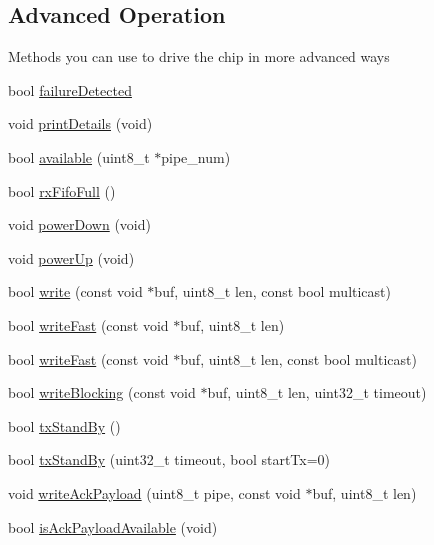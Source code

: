 \subsection*{Advanced Operation}
\label{_amgrpaf32cf1216e734b82e2b52429dae0bf6}%
 Methods you can use to drive the chip in more advanced ways \begin{DoxyCompactItemize}
\item 
bool \hyperlink{classNRF24L01_a749f38c45c00905b3d8e8c180626bff6}{failure\+Detected}
\item 
void \hyperlink{classNRF24L01_ae5c878a568b54ba045a99b9de377b13b}{print\+Details} (void)
\item 
bool \hyperlink{classNRF24L01_a6bfbb693418e2d60556637b6a3599d05}{available} (uint8\+\_\+t $\ast$pipe\+\_\+num)
\item 
bool \hyperlink{classNRF24L01_aebd4d389685333013b4bd12662c0b411}{rx\+Fifo\+Full} ()
\item 
void \hyperlink{classNRF24L01_abaf0ed9cb5b24890631d7b8bc0e3cd82}{power\+Down} (void)
\item 
void \hyperlink{classNRF24L01_a8e184a0a6ca30fbae69c1331a567deda}{power\+Up} (void)
\item 
bool \hyperlink{classNRF24L01_af59b3fd7aece1ae295a2e634a57d2b02}{write} (const void $\ast$buf, uint8\+\_\+t len, const bool multicast)
\item 
bool \hyperlink{classNRF24L01_a693f48de67c8b11ed5860dc481fcfc99}{write\+Fast} (const void $\ast$buf, uint8\+\_\+t len)
\item 
bool \hyperlink{classNRF24L01_a094a978ed0c7da890c90351bd945fabe}{write\+Fast} (const void $\ast$buf, uint8\+\_\+t len, const bool multicast)
\item 
bool \hyperlink{classNRF24L01_ac2c2500350c3dde0df4f09111f8f1b84}{write\+Blocking} (const void $\ast$buf, uint8\+\_\+t len, uint32\+\_\+t timeout)
\item 
bool \hyperlink{classNRF24L01_a4416a731de8d23cac507e8b69ec2becc}{tx\+Stand\+By} ()
\item 
bool \hyperlink{classNRF24L01_a9351f4bff2196c4f69623f636de7c6a4}{tx\+Stand\+By} (uint32\+\_\+t timeout, bool start\+Tx=0)
\item 
void \hyperlink{classNRF24L01_ae0f4b84a244463e8e594d238a71140c5}{write\+Ack\+Payload} (uint8\+\_\+t pipe, const void $\ast$buf, uint8\+\_\+t len)
\item 
bool \hyperlink{classNRF24L01_a99aae87d62d5097447305d66a0b3281d}{is\+Ack\+Payload\+Available} (void)
\item 

\end{DoxyCompactItemize}
